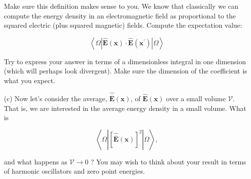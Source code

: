 \documentclass[12pt]{article}
\begin{document}
Make sure this definition makes sense to you. We know that classically we can compute the energy density in an electromagnetic field as proportional to the squared electric (plus squared magnetic) fields. Compute the expectation value:


\begin{equation*}
\left\langle\Omega\left|\hat{\mathbf{E}}(\mathbf{x}) \cdot \hat{\mathbf{E}}\left(\mathbf{x}^{\prime}\right)\right| \Omega\right\rangle \tag{8}
\end{equation*}


Try to express your answer in terms of a dimensionless integral in one dimension (which will perhaps look divergent). Make sure the dimension of the coefficient is what you expect.

(c) Now let's consider the average, $\hat{\overline{\mathbf{E}}}(\mathbf{x})$, of $\hat{\mathbf{E}}(\mathbf{x})$ over a small volume $\mathcal{V}$. That is, we are interested in the average energy density in a small volume. What is


\begin{equation*}
\left\langle\Omega\left|[\hat{\overline{\mathbf{E}}}(\mathbf{x})]^{2}\right| \Omega\right\rangle, \tag{9}
\end{equation*}


and what happens as $\mathcal{V} \rightarrow 0$ ? You may wish to think about your result in terms of harmonic oscillators and zero point energies.
\end{document}
